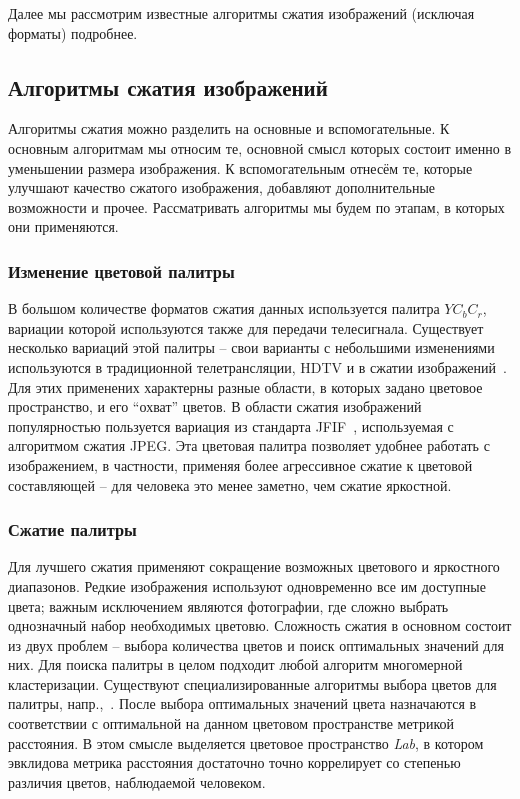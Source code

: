 \documentclass[a4paper,12pt]{article}
\numberwithin{equation}{section}
\begin{document}
Далее мы рассмотрим известные алгоритмы сжатия изображений (исключая форматы)
подробнее.

\subsection{Алгоритмы сжатия изображений}

Алгоритмы сжатия можно разделить на основные и вспомогательные. К основным
алгоритмам мы относим те, основной смысл которых состоит именно в уменьшении
размера изображения. К вспомогательным отнесём те, которые улучшают качество
сжатого изображения, добавляют дополнительные возможности и
прочее. Рассматривать алгоритмы мы будем по этапам, в которых они применяются.

\subsubsection{Изменение цветовой палитры}

В большом количестве форматов сжатия данных используется палитра $YC_bC_r$, вариации
которой используются также для передачи телесигнала. Существует несколько
вариаций этой палитры -- свои варианты с небольшими изменениями используются в
традиционной телетрансляции, HDTV и в сжатии изображений~\cite{palettes}. Для
этих применених характерны разные области, в которых задано цветовое
пространство, и его ``охват'' цветов. В области сжатия изображений популярностью
пользуется вариация из стандарта JFIF~\cite{jfif}, используемая с алгоритмом
сжатия JPEG. Эта цветовая палитра позволяет удобнее работать с
изображением, в частности, применяя более агрессивное сжатие к цветовой
составляющей -- для человека это менее заметно, чем сжатие яркостной.

\subsubsection{Сжатие палитры}

Для лучшего сжатия применяют сокращение возможных цветового и яркостного
диапазонов. Редкие изображения используют одновременно все им доступные цвета;
важным исключением являются фотографии, где сложно выбрать однозначный набор
необходимых цветовю. Сложность сжатия в основном состоит из двух проблем --
выбора количества цветов и поиск оптимальных значений для них. Для поиска
палитры в целом подходит любой алгоритм многомерной кластеризации. Существуют
специализированные алгоритмы выбора цветов для палитры,
напр.,~\cite{leptonica:colorquant}. После выбора оптимальных значений цвета
назначаются в соответствии с оптимальной на данном цветовом пространстве
метрикой расстояния. В этом смысле выделяется цветовое пространство \emph{Lab},
в котором эвклидова метрика расстояния достаточно точно коррелирует со степенью
различия цветов, наблюдаемой человеком.
\end{document}
